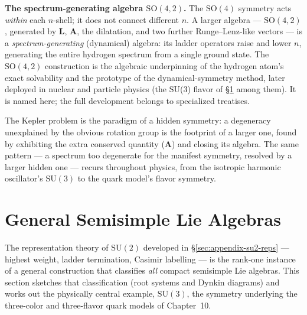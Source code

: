 \medskip\noindent\textbf{The spectrum-generating algebra $\mathrm{SO}(4,2)$.} The $\mathrm{SO}(4)$ symmetry acts \emph{within} each $n$-shell; it does not connect different $n$. A larger algebra --- $\mathrm{SO}(4,2)$, generated by $\bm L$, $\bm A$, the dilatation, and two further Runge--Lenz-like vectors --- is a \emph{spectrum-generating} (dynamical) algebra: its ladder operators raise and lower $n$, generating the entire hydrogen spectrum from a single ground state. The $\mathrm{SO}(4,2)$ construction is the algebraic underpinning of the hydrogen atom's exact solvability and the prototype of the dynamical-symmetry method, later deployed in nuclear and particle physics (the SU(3) flavor of \S\ref{sec:appendix-semisimple} among them). It is named here; the full development belongs to specialized treatises.

The Kepler problem is the paradigm of a hidden symmetry: a degeneracy unexplained by the obvious rotation group is the footprint of a larger one, found by exhibiting the extra conserved quantity ($\bm A$) and closing its algebra. The same pattern --- a spectrum too degenerate for the manifest symmetry, resolved by a larger hidden one --- recurs throughout physics, from the isotropic harmonic oscillator's $\mathrm{SU}(3)$ to the quark model's flavor symmetry.

\section{General Semisimple Lie Algebras}
\label{sec:appendix-semisimple}

The representation theory of $\mathrm{SU}(2)$ developed in \S\ref{sec:appendix-su2-reps} --- highest weight, ladder termination, Casimir labelling --- is the rank-one instance of a general construction that classifies \emph{all} compact semisimple Lie algebras. This section sketches that classification (root systems and Dynkin diagrams) and works out the physically central example, $\mathrm{SU}(3)$, the symmetry underlying the three-color and three-flavor quark models of Chapter~10.

